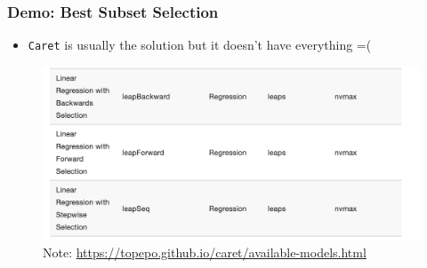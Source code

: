 \documentclass[
  shownotes,
  xcolor={svgnames},
  hyperref={colorlinks,citecolor=DarkBlue,linkcolor=DarkRed,urlcolor=DarkBlue}
  ]{beamer}
\begin{document}
\begin{frame}[fragile]
\frametitle{Demo: Best Subset Selection}
\begin{itemize}
 \item \texttt{Caret} is usually the solution but it doesn't have everything =(
\end{itemize}
 \begin{figure}[H] \centering
            \captionsetup{justification=centering}
              \includegraphics[scale=0.3]{figures/caret_leaps}
\\
\flushleft
              \scriptsize
              Note: \url{https://topepo.github.io/caret/available-models.html}
 \end{figure}


\end{frame}
\end{document}
